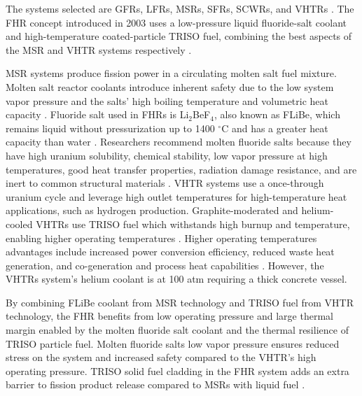 The systems selected are \glspl{GFR}, \glspl{LFR}, \glspl{MSR}, \glspl{SFR}, \glspl{SCWR}, 
and \glspl{VHTR} \cite{gif_technology_2002}. 
The \acrfull{FHR} concept introduced in 2003 uses a low-pressure liquid fluoride-salt 
coolant and high-temperature coated-particle \gls{TRISO} fuel, combining 
the best aspects of the \gls{MSR} and \gls{VHTR} systems respectively
\cite{forsberg_molten-salt-cooled_2003,facilitators_fluoride-salt-cooled_2013}.

\gls{MSR} systems produce fission power in a circulating molten salt fuel 
mixture. 
Molten salt reactor coolants introduce inherent safety due to the 
low system vapor pressure and the salts' high boiling temperature and 
volumetric heat capacity \cite{ho_molten_2013}.
Fluoride salt used in \glspl{FHR} is Li$_2$BeF$_4$, also known as \gls{FLiBe}, 
which remains liquid without pressurization up to 1400 $^{\circ}$C and has a greater 
heat capacity than water \cite{ho_molten_2013,forsberg_fluoride-salt-cooled_2012}.
Researchers recommend molten fluoride salts because they have high uranium 
solubility, chemical stability, low vapor pressure at high temperatures, 
good heat transfer properties, radiation damage resistance, and are inert 
to common structural materials \cite{rosenthal_molten-salt_1970}. 
\gls{VHTR} systems use a once-through uranium cycle and leverage 
high outlet temperatures for high-temperature heat applications, such as 
hydrogen production. 
Graphite-moderated and helium-cooled \glspl{VHTR} use \gls{TRISO} fuel
which withstands high burnup and temperature, enabling higher operating 
temperatures \cite{gif_technology_2002}.  
Higher operating temperatures advantages include increased power 
conversion efficiency, reduced waste heat generation, and co-generation and 
process heat capabilities \cite{scarlat_design_2014}.
However, the \glspl{VHTR} system's helium coolant is at 100 atm requiring a 
thick concrete vessel. 

By combining \gls{FLiBe} coolant from \gls{MSR} technology and 
\gls{TRISO} fuel from \gls{VHTR} technology, the \gls{FHR} benefits from 
low operating pressure and large thermal margin enabled by the molten fluoride
salt coolant and the thermal resilience of \gls{TRISO} particle fuel. 
Molten fluoride salts low vapor pressure ensures reduced stress on the system
and increased safety compared to the \gls{VHTR}'s high operating pressure. 
\gls{TRISO} solid fuel cladding in the \gls{FHR} system adds an extra barrier 
to fission product release compared to \glspl{MSR} with liquid fuel 
\cite{ho_molten_2013}.

